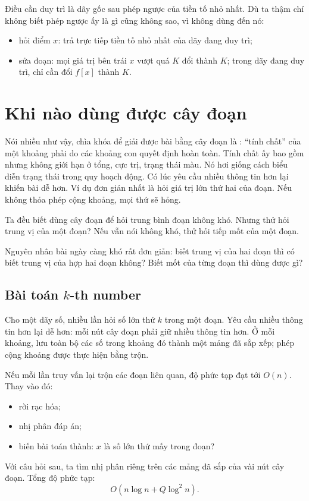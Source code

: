 \documentclass[11pt]{article}
\begin{document}
Điều cần duy trì là dãy gốc sau phép ngược của tiền tố nhỏ nhất.  Dù ta thậm
chí không biết phép ngược ấy là gì cũng không sao, vì không dùng đến nó:
\begin{itemize}
  \item hỏi điểm $x$: trả trực tiếp tiền tố nhỏ nhất của dãy đang duy trì;
  \item sửa đoạn: mọi giá trị bên trái $x$ vượt quá $K$ đổi thành $K$; trong
  dãy đang duy trì, chỉ cần đổi $f[x]$ thành $K$.
\end{itemize}

\section{Khi nào dùng được cây đoạn}

Nói nhiều như vậy, chìa khóa để giải được bài bằng cây đoạn là
: ``tính chất'' của một khoảng phải do các khoảng con
quyết định hoàn toàn.  Tính chất ấy bao gồm nhưng không giới hạn ở tổng, cực
trị, trạng thái màu.  Nó hơi giống cách biểu diễn trạng thái trong quy hoạch
động.  Có lúc yêu cầu nhiều thông tin hơn lại khiến bài dễ hơn.  Ví dụ đơn
giản nhất là hỏi giá trị lớn thứ hai của đoạn.  Nếu không thỏa phép cộng
khoảng, mọi thứ sẽ hỏng.

Ta đều biết dùng cây đoạn để hỏi trung bình đoạn không khó.  Nhưng thử hỏi
trung vị của một đoạn?  Nếu vẫn nói không khó, thử hỏi tiếp mốt của một đoạn.

Nguyên nhân bài ngày càng khó rất đơn giản: biết trung vị của hai đoạn thì có
biết trung vị của hợp hai đoạn không?  Biết mốt của từng đoạn thì dùng được gì?

\subsection{\texorpdfstring{Bài toán $k$-th number}{Bai toan k-th number}}

Cho một dãy số, nhiều lần hỏi số lớn thứ $k$ trong một đoạn.  Yêu cầu nhiều
thông tin hơn lại dễ hơn: mỗi nút cây đoạn phải giữ nhiều thông tin hơn.  Ở
mỗi khoảng, lưu toàn bộ các số trong khoảng đó thành một mảng đã sắp xếp; phép
cộng khoảng được thực hiện bằng trộn.

Nếu mỗi lần truy vấn lại trộn các đoạn liên quan, độ phức tạp đạt tới $O(n)$.
Thay vào đó:
\begin{itemize}
  \item rời rạc hóa;
  \item nhị phân đáp án;
  \item biến bài toán thành: $x$ là số lớn thứ mấy trong đoạn?
\end{itemize}
Với câu hỏi sau, ta tìm nhị phân riêng trên các mảng đã sắp của vài nút cây
đoạn.  Tổng độ phức tạp:
\[
  O(n\log n + Q\log^2 n).
\]
\end{document}
